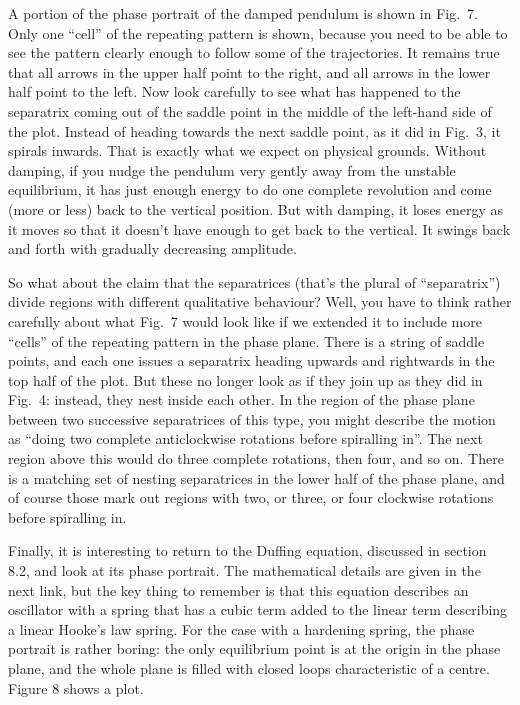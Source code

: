 
  A portion of the phase portrait of the damped pendulum is shown in Fig.\ 7. 
  Only one ``cell'' of the repeating pattern is shown, because you need to be 
  able to see the pattern clearly enough to follow some of the trajectories. It 
  remains true that all arrows in the upper half point to the right, and all 
  arrows in the lower half point to the left. Now look carefully to see what 
  has happened to the separatrix coming out of the saddle point in the middle 
  of the left-hand side of the plot. Instead of heading towards the next saddle 
  point, as it did in Fig.\ 3, it spirals inwards. That is exactly what we 
  expect on physical grounds. Without damping, if you nudge the pendulum very 
  gently away from the unstable equilibrium, it has just enough energy to do 
  one complete revolution and come (more or less) back to the vertical 
  position. But with damping, it loses energy as it moves so that it doesn't 
  have enough to get back to the vertical. It swings back and forth with 
  gradually decreasing amplitude. 


  So what about the claim that the separatrices (that's the plural of 
  ``separatrix'') divide regions with different qualitative behaviour? Well, 
  you have to think rather carefully about what Fig.\ 7 would look like if we 
  extended it to include more ``cells'' of the repeating pattern in the phase 
  plane. There is a string of saddle points, and each one issues a separatrix 
  heading upwards and rightwards in the top half of the plot. But these no 
  longer look as if they join up as they did in Fig.\ 4: instead, they nest 
  inside each other. In the region of the phase plane between two successive 
  separatrices of this type, you might describe the motion as ``doing two 
  complete anticlockwise rotations before spiralling in''. The next region 
  above this would do three complete rotations, then four, and so on. There is 
  a matching set of nesting separatrices in the lower half of the phase plane, 
  and of course those mark out regions with two, or three, or four clockwise 
  rotations before spiralling in. 

  Finally, it is interesting to return to the Duffing equation, discussed in 
  section 8.2, and look at its phase portrait. The mathematical details are 
  given in the next link, but the key thing to remember is that this equation 
  describes an oscillator with a spring that has a cubic term added to the 
  linear term describing a linear Hooke's law spring. For the case with a 
  hardening spring, the phase portrait is rather boring: the only equilibrium 
  point is at the origin in the phase plane, and the whole plane is filled with 
  closed loops characteristic of a centre. Figure 8 shows a plot. 

